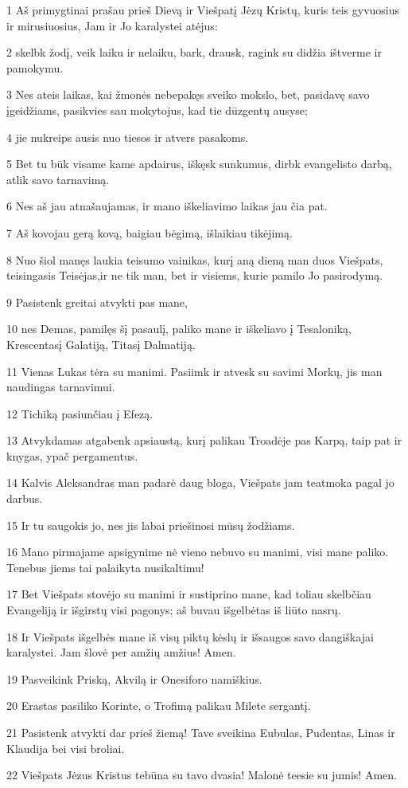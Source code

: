 \par 1 Aš primygtinai prašau prieš Dievą ir Viešpatį Jėzų Kristų, kuris teis gyvuosius ir mirusiuosius, Jam ir Jo karalystei atėjus: 
\par 2 skelbk žodį, veik laiku ir nelaiku, bark, drausk, ragink su didžia ištverme ir pamokymu. 
\par 3 Nes ateis laikas, kai žmonės nebepakęs sveiko mokslo, bet, pasidavę savo įgeidžiams, pasikvies sau mokytojus, kad tie dūzgentų ausyse; 
\par 4 jie nukreips ausis nuo tiesos ir atvers pasakoms. 
\par 5 Bet tu būk visame kame apdairus, iškęsk sunkumus, dirbk evangelisto darbą, atlik savo tarnavimą. 
\par 6 Nes aš jau atnašaujamas, ir mano iškeliavimo laikas jau čia pat. 
\par 7 Aš kovojau gerą kovą, baigiau bėgimą, išlaikiau tikėjimą. 
\par 8 Nuo šiol manęs laukia teisumo vainikas, kurį aną dieną man duos Viešpats, teisingasis Teisėjas,­ir ne tik man, bet ir visiems, kurie pamilo Jo pasirodymą. 
\par 9 Pasistenk greitai atvykti pas mane, 
\par 10 nes Demas, pamilęs šį pasaulį, paliko mane ir iškeliavo į Tesaloniką, Krescentas­į Galatiją, Titas­į Dalmatiją. 
\par 11 Vienas Lukas tėra su manimi. Pasiimk ir atvesk su savimi Morkų, jis man naudingas tarnavimui. 
\par 12 Tichiką pasiunčiau į Efezą. 
\par 13 Atvykdamas atgabenk apsiaustą, kurį palikau Troadėje pas Karpą, taip pat ir knygas, ypač pergamentus. 
\par 14 Kalvis Aleksandras man padarė daug bloga, Viešpats jam teatmoka pagal jo darbus. 
\par 15 Ir tu saugokis jo, nes jis labai priešinosi mūsų žodžiams. 
\par 16 Mano pirmajame apsigynime nė vieno nebuvo su manimi, visi mane paliko. Tenebus jiems tai palaikyta nusikaltimu! 
\par 17 Bet Viešpats stovėjo su manimi ir sustiprino mane, kad toliau skelbčiau Evangeliją ir išgirstų visi pagonys; aš buvau išgelbėtas iš liūto nasrų. 
\par 18 Ir Viešpats išgelbės mane iš visų piktų kėslų ir išsaugos savo dangiškajai karalystei. Jam šlovė per amžių amžius! Amen. 
\par 19 Pasveikink Priską, Akvilą ir Onesiforo namiškius. 
\par 20 Erastas pasiliko Korinte, o Trofimą palikau Milete sergantį. 
\par 21 Pasistenk atvykti dar prieš žiemą! Tave sveikina Eubulas, Pudentas, Linas ir Klaudija bei visi broliai. 
\par 22 Viešpats Jėzus Kristus tebūna su tavo dvasia! Malonė teesie su jumis! Amen.



